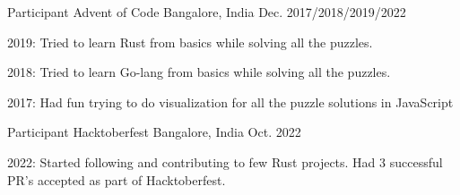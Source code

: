 

\begin{cventries}

  \cventry
    {Participant} %
    {Advent of Code} %
    {Bangalore, India} %
    {Dec. 2017/2018/2019/2022} %
    {
      \begin{cvitems} %
        \item {2019: Tried to learn Rust from basics while solving all the puzzles.}
        \item {2018: Tried to learn Go-lang from basics while solving all the puzzles.}
        \item {2017: Had fun trying to do visualization for all the puzzle solutions in JavaScript}
      \end{cvitems}
    }

  \cventry
    {Participant} %
    {Hacktoberfest} %
    {Bangalore, India} %
    {Oct. 2022} %
    {
      \begin{cvitems} %
        \item {2022: Started following and contributing to few Rust projects. Had 3 successful PR's accepted as part of Hacktoberfest.}
      \end{cvitems}
    }

\end{cventries}
